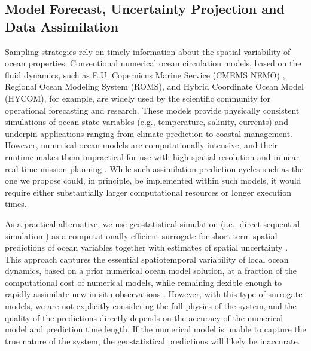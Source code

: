 \subsection{Model Forecast, Uncertainty Projection and Data Assimilation}

Sampling strategies rely on timely information about the spatial
variability of ocean properties. Conventional numerical ocean
circulation models, based on the fluid dynamics, such as
E.U. Copernicus Marine Service (CMEMS NEMO) \parencite{CMEMS2017},
Regional Ocean Modeling System (ROMS)\parencite{shchepetkin2005regional},
and Hybrid Coordinate Ocean Model (HYCOM)\parencite{wallcraft09}, for
example, are widely used by the scientific community for operational
forecasting and research. These models provide physically consistent
simulations of ocean state variables (e.g., temperature, salinity,
currents) and underpin applications ranging from climate prediction to
coastal management. However, numerical ocean models are
computationally intensive, and their runtime makes them impractical
for use with high spatial resolution and in near real-time mission
planning \parencite{agarwal21}. While such assimilation-prediction cycles
such as the one we propose could, in principle, be implemented within
such models, it would require either substantially larger
computational resources or longer execution times.

As a practical alternative, we use geostatistical simulation (i.e.,
direct sequential simulation \parencite{soares2001direct}) as a
computationally efficient surrogate for short-term spatial predictions
of ocean variables together with estimates of spatial uncertainty
\parencite{deutsch1992}. This approach captures the essential
spatiotemporal variability of local ocean dynamics, based on a prior
numerical ocean model solution, at a fraction of the computational
cost of numerical models, while remaining flexible enough to rapidly
assimilate new in-situ observations \parencite{duarte2025}.  However, with
this type of surrogate models, we are not explicitly considering the
full-physics of the system, and the quality of the predictions
directly depends on the accuracy of the numerical model and prediction
time length. If the numerical model is unable to capture the true
nature of the system, the geostatistical predictions will likely be
inaccurate.


